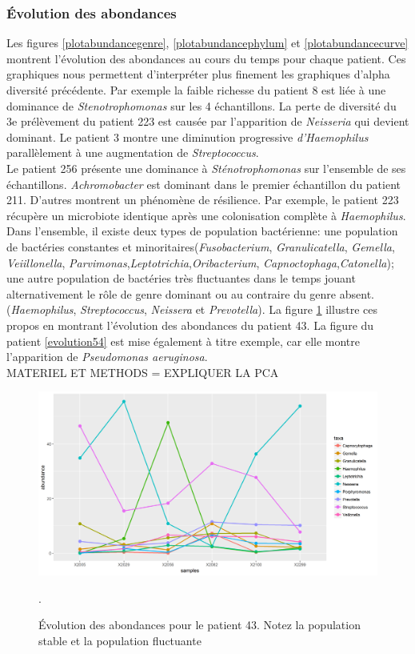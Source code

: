 \documentclass[12pt,a4paper]{article}
\begin{document}
\subsubsection{Évolution des abondances}
Les figures \ref{plotabundancegenre}, \ref{plotabundancephylum} et \ref{plotabundancecurve} montrent l’évolution des abondances au cours du temps pour chaque patient. Ces graphiques nous permettent d’interpréter plus finement les graphiques d’alpha diversité précédente.
Par exemple la faible richesse du patient 8 est liée à une dominance de \textit{Stenotrophomonas} sur les 4 échantillons.
La perte de diversité du 3e prélèvement du patient 223 est causée par l'apparition de \textit{Neisseria} qui devient dominant.
Le patient 3 montre une diminution progressive \textit{d’Haemophilus} parallèlement à une augmentation de \textit{Streptococcus}. \\
Le patient 256 présente une dominance à \textit{Sténotrophomonas} sur l'ensemble de ses échantillons. \textit{Achromobacter} est dominant dans le premier échantillon du patient 211.
D’autres montrent un phénomène de résilience. Par exemple, le patient 223 récupère un microbiote identique après une colonisation complète à \textit{Haemophilus}. \\
Dans l’ensemble, il existe deux types de population bactérienne: une population de bactéries constantes et minoritaires(\textit{Fusobacterium}, \textit{Granulicatella}, \textit{Gemella}, \textit{Veiillonella}, \textit{Parvimonas},\textit{Leptotrichia},\textit{Oribacterium}, \textit{Capnoctophaga},\textit{Catonella}); une autre population de bactéries très fluctuantes dans le temps jouant alternativement le rôle de genre dominant ou au contraire du genre absent. (\textit{Haemophilus}, \textit{Streptococcus}, \textit{Neissera} et \textit{Prevotella}).
La figure \ref{evolution43} illustre ces propos en montrant l'évolution des abondances du patient 43.
La figure du patient \ref{evolution54} est mise également à titre exemple, car elle montre l’apparition de \textit{Pseudomonas aeruginosa}. \\
MATERIEL ET METHODS = EXPLIQUER LA PCA 

\begin{figure}
\begin{center}
\includegraphics[scale=0.60]{img/curve_043.png}\hfill
\end{center}
\caption{Évolution des abondances pour le patient 43. Notez la population stable et la population fluctuante}.
\label{evolution43}
\end{figure}
\end{document}
